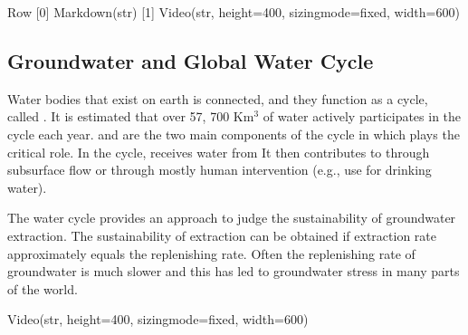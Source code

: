 \documentclass[letterpaper,10pt,english]{sphinxmanual}
\begin{document}
\begin{sphinxVerbatim}[commandchars=\\\{\}]
Row
    [0] Markdown(str)
    [1] Video(str, height=400, sizing\PYGZus{}mode=\PYGZsq{}fixed\PYGZsq{}, width=600)
\end{sphinxVerbatim}


\subsection{Groundwater and Global Water Cycle}
\label{\detokenize{contents/background/03_basic_hydrogeology:groundwater-and-global-water-cycle}}
Water bodies that exist on earth is connected, and they function as a cycle, called . It is estimated that over 57, 700 Km\(^3\) of water actively participates in the cycle each year.  and  are the two main components of the cycle in which  plays the critical role. In the cycle,  receives water from  It then contributes to  through subsurface flow or through mostly human intervention (e.g., use for drinking water).

The water cycle provides an approach to judge the sustainability of groundwater extraction. The sustainability of extraction can be obtained if extraction rate approximately equals the replenishing rate. Often the replenishing rate of groundwater is much slower and this has led to groundwater stress in many parts of the world.

\begin{sphinxVerbatim}[commandchars=\\\{\}]
     
\end{sphinxVerbatim}

\begin{sphinxVerbatim}[commandchars=\\\{\}]
Video(str, height=400, sizing\PYGZus{}mode=\PYGZsq{}fixed\PYGZsq{}, width=600)
\end{sphinxVerbatim}
\end{document}

